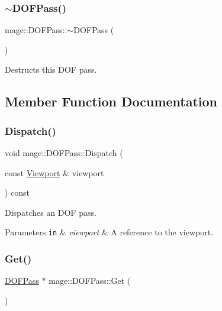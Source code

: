 \subsubsection{\texorpdfstring{$\sim$\+D\+O\+F\+Pass()}{~DOFPass()}}
{\footnotesize\ttfamily mage\+::\+D\+O\+F\+Pass\+::$\sim$\+D\+O\+F\+Pass (\begin{DoxyParamCaption}{ }\end{DoxyParamCaption})\hspace{0.3cm}{\ttfamily [default]}}

Destructs this D\+OF pass. 

\subsection{Member Function Documentation}
\hypertarget{classmage_1_1_d_o_f_pass_a772b6b1b4a1f5a588f2c3342ef187db6}{}\label{classmage_1_1_d_o_f_pass_a772b6b1b4a1f5a588f2c3342ef187db6} 
\subsubsection{\texorpdfstring{Dispatch()}{Dispatch()}}
{\footnotesize\ttfamily void mage\+::\+D\+O\+F\+Pass\+::\+Dispatch (\begin{DoxyParamCaption}\item[{const \hyperlink{classmage_1_1_viewport}{Viewport} \&}]{viewport }\end{DoxyParamCaption}) const\hspace{0.3cm}{\ttfamily [noexcept]}}

Dispatches an D\+OF pass.


\begin{DoxyParams}[1]{Parameters}
\mbox{\tt in}  & {\em viewport} & A reference to the viewport. \\
\hline
\end{DoxyParams}
\hypertarget{classmage_1_1_d_o_f_pass_a93327517f36b8558d6bdffedb6179298}{}\label{classmage_1_1_d_o_f_pass_a93327517f36b8558d6bdffedb6179298} 
\subsubsection{\texorpdfstring{Get()}{Get()}}
{\footnotesize\ttfamily \hyperlink{classmage_1_1_d_o_f_pass}{D\+O\+F\+Pass} $\ast$ mage\+::\+D\+O\+F\+Pass\+::\+Get (\begin{DoxyParamCaption}{ }\end{DoxyParamCaption})\hspace{0.3cm}{\ttfamily [static]}}

